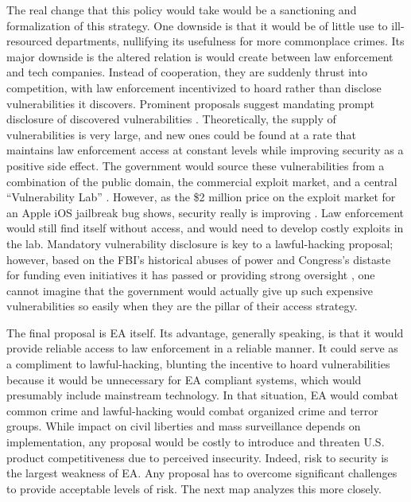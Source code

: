 The real change that this policy would take would be a sanctioning and formalization of this strategy. One downside is
that it would be of little use to ill-resourced departments, nullifying its usefulness for more commonplace crimes. Its
major downside is the altered relation is would create between law enforcement and tech companies. Instead of
cooperation, they are suddenly thrust into competition, with law enforcement incentivized to hoard rather than disclose
vulnerabilities it discovers. Prominent proposals suggest mandating prompt disclosure of discovered vulnerabilities
\cite{bellovin_lawful_2013} \cite{hennessey_lawful_2016}. Theoretically, the supply of vulnerabilities is very large,
and new ones could be found at a rate that maintains law enforcement access at constant levels while improving security
as a positive side effect. The government would source these vulnerabilities from a combination of the public domain,
the commercial exploit market, and a central ``Vulnerability Lab'' \cite{bellovin_lawful_2013}. However, as the \$2
million price on the exploit market for an Apple iOS jailbreak bug shows, security really is improving
\cite{goodin_zeroday_2019}. Law enforcement would still find itself without access, and would need to develop costly
exploits in the lab. Mandatory vulnerability disclosure is key to a \ac{lawful-hacking} proposal; however, based on the
\ac{FBI}'s historical abuses of power \cite{shamsi_2011} and Congress's distaste for funding even initiatives it has
passed \cite{keller_internet_2019} or providing strong oversight \cite{johnson_congressional_2004}, one cannot imagine
that the government would actually give up such expensive vulnerabilities so easily when they are the pillar of their
access strategy.


The final proposal is \ac{EA} itself. Its advantage, generally speaking, is that it would provide reliable access to law
enforcement in a reliable manner. It could serve as a compliment to \ac{lawful-hacking}, blunting the incentive to hoard
vulnerabilities because it would be unnecessary for \ac{EA} compliant systems, which would presumably include mainstream
technology. In that situation, \ac{EA} would combat common crime and \ac{lawful-hacking} would combat organized crime
and terror groups. While impact on civil liberties and mass surveillance depends on implementation, any proposal would
be costly to introduce and threaten U.S. product competitiveness due to perceived insecurity. Indeed, risk to security
is the largest weakness of \ac{EA}. Any proposal has to overcome significant challenges to provide acceptable levels of
risk. The next map analyzes this more closely.


